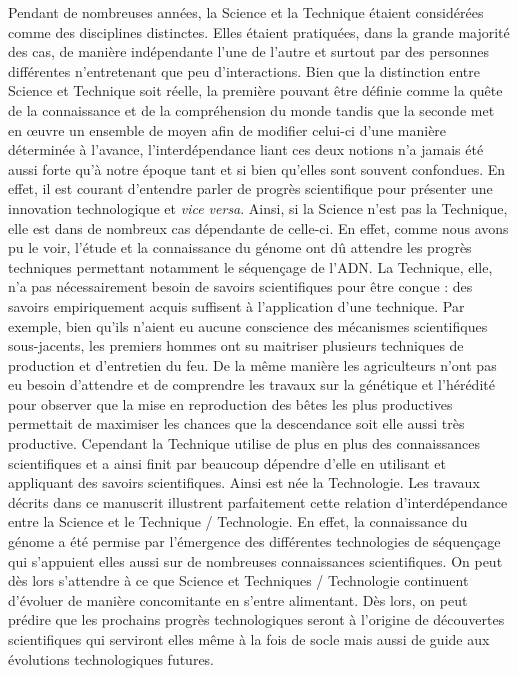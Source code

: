 \documentclass[12pt,a4paper,twoside]{ugathesis}
\theoremstyle{definition}
\theoremstyle{definition}
\theoremstyle{definition}
\theoremstyle{remark}
\begin{document}
Pendant de nombreuses années, la Science et la Technique étaient
considérées comme des disciplines distinctes. Elles étaient pratiquées,
dans la grande majorité des cas, de manière indépendante l'une de
l'autre et surtout par des personnes différentes n'entretenant que peu
d'interactions. Bien que la distinction entre Science et Technique soit
réelle, la première pouvant être définie comme la quête de la
connaissance et de la compréhension du monde tandis que la seconde met
en œuvre un ensemble de moyen afin de modifier celui-ci d'une manière
déterminée à l'avance, l'interdépendance liant ces deux notions n'a
jamais été aussi forte qu'à notre époque tant et si bien qu'elles sont
souvent confondues. En effet, il est courant d'entendre parler de
progrès scientifique pour présenter une innovation technologique et
\emph{vice versa}. Ainsi, si la Science n'est pas la Technique, elle est
dans de nombreux cas dépendante de celle-ci. En effet, comme nous avons
pu le voir, l'étude et la connaissance du génome ont dû attendre les
progrès techniques permettant notamment le séquençage de l'ADN. La
Technique, elle, n'a pas nécessairement besoin de savoirs scientifiques
pour être conçue : des savoirs empiriquement acquis suffisent à
l'application d'une technique. Par exemple, bien qu'ils n'aient eu
aucune conscience des mécanismes scientifiques sous-jacents, les
premiers hommes ont su maitriser plusieurs techniques de production et
d'entretien du feu. De la même manière les agriculteurs n'ont pas eu
besoin d'attendre et de comprendre les travaux sur la génétique et
l'hérédité pour observer que la mise en reproduction des bêtes les plus
productives permettait de maximiser les chances que la descendance soit
elle aussi très productive. Cependant la Technique utilise de plus en
plus des connaissances scientifiques et a ainsi finit par beaucoup
dépendre d'elle en utilisant et appliquant des savoirs scientifiques.
Ainsi est née la Technologie. Les travaux décrits dans ce manuscrit
illustrent parfaitement cette relation d'interdépendance entre la
Science et le Technique / Technologie. En effet, la connaissance du
génome a été permise par l'émergence des différentes technologies de
séquençage qui s'appuient elles aussi sur de nombreuses connaissances
scientifiques. On peut dès lors s'attendre à ce que Science et
Techniques / Technologie continuent d'évoluer de manière concomitante en
s'entre alimentant. Dès lors, on peut prédire que les prochains progrès
technologiques seront à l'origine de découvertes scientifiques qui
serviront elles même à la fois de socle mais aussi de guide aux
évolutions technologiques futures.
\end{document}
